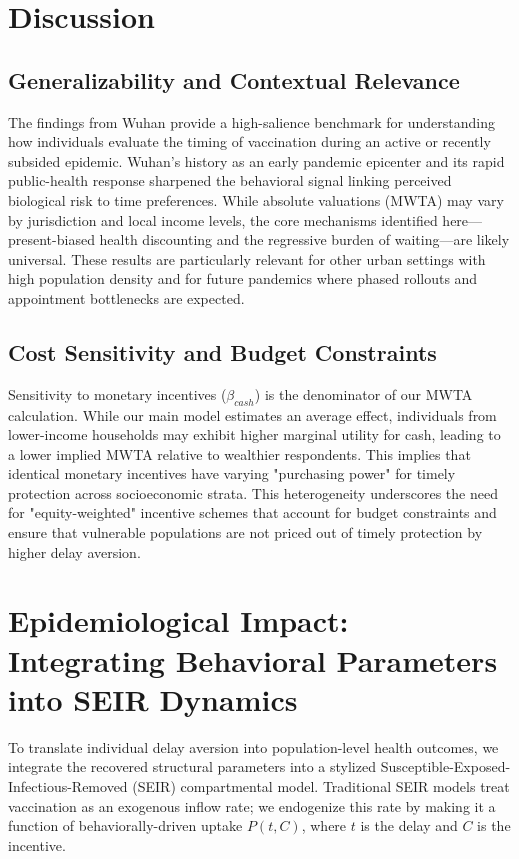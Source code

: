 \documentclass[12pt]{article}
\begin{document}
\section{Discussion}

\subsection{Generalizability and Contextual Relevance}

The findings from Wuhan provide a high-salience benchmark for understanding how individuals 
evaluate the timing of vaccination during an active or recently subsided epidemic. 
Wuhan's history as an early pandemic epicenter and its rapid public-health response 
sharpened the behavioral signal linking perceived biological risk to time preferences. 
While absolute valuations (MWTA) may vary by jurisdiction and local income levels, the 
core mechanisms identified here---present-biased health discounting and the regressive 
burden of waiting---are likely universal. These results are particularly relevant for 
other urban settings with high population density and for future pandemics where phased 
rollouts and appointment bottlenecks are expected.

\subsection{Cost Sensitivity and Budget Constraints}

Sensitivity to monetary incentives ($\beta_{cash}$) is the denominator of our MWTA 
calculation. While our main model estimates an average effect, individuals from lower-income 
households may exhibit higher marginal utility for cash, leading to a lower implied MWTA 
relative to wealthier respondents. This implies that identical monetary incentives have 
varying "purchasing power" for timely protection across socioeconomic strata. This 
heterogeneity underscores the need for "equity-weighted" incentive schemes that account for 
budget constraints and ensure that vulnerable populations are not priced out of timely 
protection by higher delay aversion.


\section{Epidemiological Impact: Integrating Behavioral Parameters into SEIR Dynamics}

To translate individual delay aversion into population-level health outcomes, we integrate 
the recovered structural parameters into a stylized Susceptible-Exposed-Infectious-Removed 
(SEIR) compartmental model. Traditional SEIR models treat vaccination as an exogenous 
inflow rate; we endogenize this rate by making it a function of behaviorally-driven 
uptake $P(t, C)$, where $t$ is the delay and $C$ is the incentive.
\end{document}
